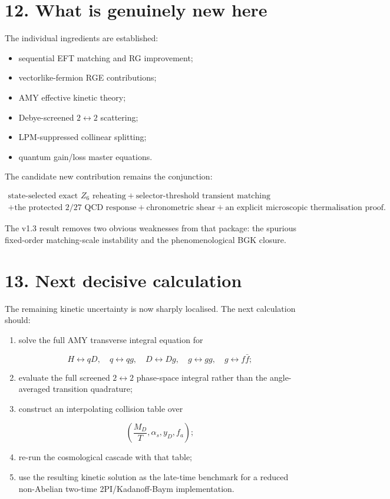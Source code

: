 \documentclass[
  10pt,
]{article}
\providecommand{\tightlist}{%
  \setlength{\itemsep}{0pt}\setlength{\parskip}{0pt}}
\begin{document}
\section{12. What is genuinely new
here}\label{what-is-genuinely-new-here}

The individual ingredients are established:

\begin{itemize}
\tightlist
\item
  sequential EFT matching and RG improvement;
\item
  vectorlike-fermion RGE contributions;
\item
  AMY effective kinetic theory;
\item
  Debye-screened \(2\leftrightarrow2\) scattering;
\item
  LPM-suppressed collinear splitting;
\item
  quantum gain/loss master equations.
\end{itemize}

The candidate new contribution remains the conjunction:

\[
\boxed{
\begin{gathered}
\text{state-selected exact }Z_6\text{ reheating}
+
\text{selector-threshold transient matching}
\\
+
\text{the protected }2/27\text{ QCD response}
+
\text{chronometric shear}
+
\text{an explicit microscopic thermalisation proof.}
\end{gathered}
}
\]

The v1.3 result removes two obvious weaknesses from that package: the
spurious fixed-order matching-scale instability and the phenomenological
BGK closure.

\section{13. Next decisive calculation}\label{next-decisive-calculation}

The remaining kinetic uncertainty is now sharply localised. The next
calculation should:

\begin{enumerate}
\def\labelenumi{\arabic{enumi}.}
\item
  solve the full AMY transverse integral equation for

  \[
  H\leftrightarrow qD,
  \quad
  q\leftrightarrow qg,
  \quad
  D\leftrightarrow Dg,
  \quad
  g\leftrightarrow gg,
  \quad
  g\leftrightarrow f\bar f;
  \]
\item
  evaluate the full screened \(2\leftrightarrow2\) phase-space integral
  rather than the angle-averaged transition quadrature;
\item
  construct an interpolating collision table over

  \[
  \left(\frac{M_D}{T},\alpha_s,y_D,f_a\right);
  \]
\item
  re-run the cosmological cascade with that table;
\item
  use the resulting kinetic solution as the late-time benchmark for a
  reduced non-Abelian two-time 2PI/Kadanoff-Baym implementation.
\end{enumerate}
\end{document}
